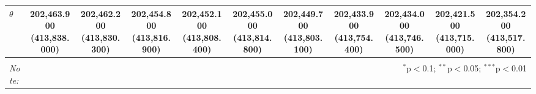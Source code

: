 \begin{table}[!htbp]
\begin{tabular}{@{\extracolsep{5pt}}lcccccccccc}
$\theta$ & 202,463.900  (413,838.000) & 202,462.200  (413,830.300) & 202,454.800  (413,816.900) & 202,452.100  (413,808.400) & 202,455.000  (413,814.800) & 202,449.700  (413,803.100) & 202,433.900  (413,754.400) & 202,434.000  (413,746.500) & 202,421.500  (413,715.000) & 202,354.200  (413,517.800) \\ 
\hline 
\hline \\[-1.8ex] 
\textit{Note:}  & \multicolumn{10}{r}{$^{*}$p$<$0.1; $^{**}$p$<$0.05; $^{***}$p$<$0.01} \\ 
\end{tabular} 
\end{table} 
